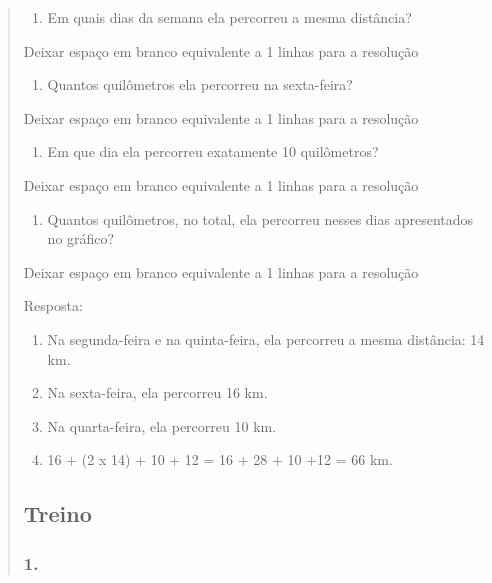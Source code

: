 \begin{enumerate}
\begin{escolha}
\begin{enumerate}
\begin{itemize}
\begin{itemize}
\begin{escolha}
\begin{quote}
\begin{escolha}
{\begin{enumerate}
\def\labelenumi{\alph{enumi})}
\item
  Em quais dias da semana ela percorreu a mesma distância?
\end{enumerate}

Deixar espaço em branco equivalente a 1 linhas para a resolução

\begin{enumerate}
\def\labelenumi{\alph{enumi})}
\item
  Quantos quilômetros ela percorreu na sexta-feira?
\end{enumerate}

Deixar espaço em branco equivalente a 1 linhas para a resolução

\begin{enumerate}
\def\labelenumi{\alph{enumi})}
\item
  Em que dia ela percorreu exatamente 10 quilômetros?
\end{enumerate}

Deixar espaço em branco equivalente a 1 linhas para a resolução

\begin{enumerate}
\def\labelenumi{\alph{enumi})}
\item
  Quantos quilômetros, no total, ela percorreu nesses dias apresentados
  no gráfico?
\end{enumerate}

Deixar espaço em branco equivalente a 1 linhas para a resolução

Resposta:

\begin{enumerate}
\def\labelenumi{\alph{enumi})}
\item
  Na segunda-feira e na quinta-feira, ela percorreu a mesma distância: 14 km.
\item
  Na sexta-feira, ela percorreu 16 km.
\item
  Na quarta-feira, ela percorreu 10 km.
\item
  16 + (2 x 14) + 10 + 12 = 16 + 28 + 10 +12 = 66 km.
\end{enumerate}

\subsection{Treino}\label{treino-7}

\subsubsection{1.}\label{section-101}

}
\end{escolha}
\end{quote}
\end{escolha}
\end{itemize}
\end{itemize}
\end{enumerate}
\end{escolha}
\end{enumerate}
